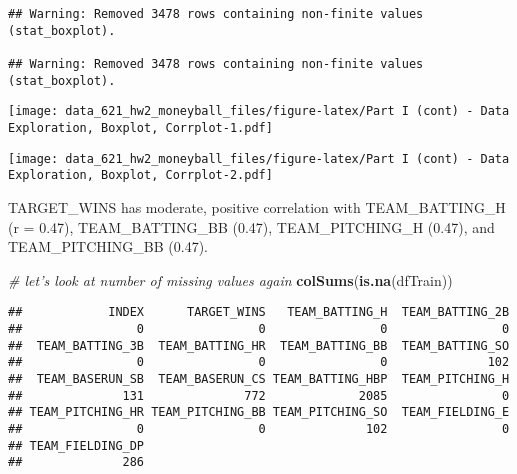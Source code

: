 \documentclass[
]{article}
\newenvironment{Shaded}{\begin{snugshade}}{\end{snugshade}}
\newcommand{\CommentTok}[1]{\textcolor[rgb]{0.56,0.35,0.01}{\textit{#1}}}
\newcommand{\DataTypeTok}[1]{\textcolor[rgb]{0.13,0.29,0.53}{#1}}
\newcommand{\KeywordTok}[1]{\textcolor[rgb]{0.13,0.29,0.53}{\textbf{#1}}}
\newcommand{\NormalTok}[1]{#1}
\newcommand{\OperatorTok}[1]{\textcolor[rgb]{0.81,0.36,0.00}{\textbf{#1}}}
\newcommand{\StringTok}[1]{\textcolor[rgb]{0.31,0.60,0.02}{#1}}
\begin{document}
\begin{verbatim}
## Warning: Removed 3478 rows containing non-finite values (stat_boxplot).

## Warning: Removed 3478 rows containing non-finite values (stat_boxplot).
\end{verbatim}

\texttt{[image: data\_621\_hw2\_moneyball\_files/figure-latex/Part I (cont) - Data Exploration, Boxplot, Corrplot-1.pdf]}

\begin{Shaded}
\end{Shaded}

\texttt{[image: data\_621\_hw2\_moneyball\_files/figure-latex/Part I (cont) - Data Exploration, Boxplot, Corrplot-2.pdf]}

TARGET\_WINS has moderate, positive correlation with TEAM\_BATTING\_H (r
= 0.47), TEAM\_BATTING\_BB (0.47), TEAM\_PITCHING\_H (0.47), and
TEAM\_PITCHING\_BB (0.47).

\begin{Shaded}
\begin{Highlighting}[]
\CommentTok{# let's look at number of missing values again}
\KeywordTok{colSums}\NormalTok{(}\KeywordTok{is.na}\NormalTok{(dfTrain))}
\end{Highlighting}
\end{Shaded}

\begin{verbatim}
##            INDEX      TARGET_WINS   TEAM_BATTING_H  TEAM_BATTING_2B 
##                0                0                0                0 
##  TEAM_BATTING_3B  TEAM_BATTING_HR  TEAM_BATTING_BB  TEAM_BATTING_SO 
##                0                0                0              102 
##  TEAM_BASERUN_SB  TEAM_BASERUN_CS TEAM_BATTING_HBP  TEAM_PITCHING_H 
##              131              772             2085                0 
## TEAM_PITCHING_HR TEAM_PITCHING_BB TEAM_PITCHING_SO  TEAM_FIELDING_E 
##                0                0              102                0 
## TEAM_FIELDING_DP 
##              286
\end{verbatim}
\end{document}
